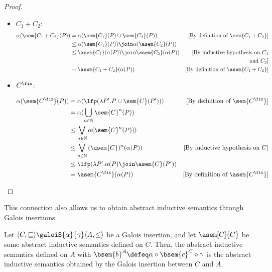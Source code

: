 \begin{proof}
\begin{itemize}
    \item $C_1 + C_2$:
      \begin{align*}
        \alpha(\sem{C_1 + C_2}(P))
          &= \alpha(\sem{C_1}(P) \cup \sem{C_2}(P))
          &\text{[By definition of $\sem{C_1 + C_2}$]}\\
          &\leq \alpha(\sem{C_1}(P)) \join \alpha(\asem{C_2}(P)) \\
          &\leq \asem{C_1}(\alpha(P)) \join \asem{C_2}(\alpha(P))
          &\text{[By inductive hypothesis on $C_1$} \\
          && \text{and $C_2$]} \\
          &= \asem{C_1 + C_2}(\alpha(P))
          &\text{[By definition of $\asem{C_1 + C_2}$]}\\
      \end{align*}
    
    \item $C^\fix$:

      \begin{align*}
        \alpha(\sem{C^\fix}(P) )
          &= \alpha(\lfp(\lambda P'. P \cup \sem{C}(P')))
          &\text{[By definition of $\sem{C^\fix}$]}\\
          &= \alpha(\bigcup_{n \in \mathbb{N}}{\sem{C}^n(P)}) \\
          &\leq \bigvee_{n \in \mathbb{N}}{\alpha(\sem{C}^n(P))}) \\
          &\leq \bigvee_{n \in \mathbb{N}}{(\asem{C})^n(\alpha(P))}
          &\text{[By inductive hypothesis on $C$]}\\
          &\leq \lfp(\lambda P'. \alpha(P) \join \asem{C}(P')) \\
          &= \asem{C^\fix}(\alpha(P)) 
          &\text{[By definition of $\asem{C^\fix}$]}\\
      \end{align*}
  \end{itemize}
\end{proof}

This connection also allows us to obtain abstract inductive semantics through 
Galois insertions.

\begin{definition}
  \label{def:aisgi}
  Let $\langle C, \sqsubseteq \rangle \galoiS{\alpha}{\gamma} \langle A, \leq
  \rangle$ be a Galois insertion, and let $\asem[C]{C}$ be some abstract
  inductive semantics defined on $C$. Then, the abstract inductive semantics
  defined on $A$ with $\bsem{b}^A \defeq \alpha \circ \bsem{c}^C \circ \gamma$
  is the abstract inductive semantics obtained by the Galois insertion between
  $C$ and $A$.
\end{definition}


